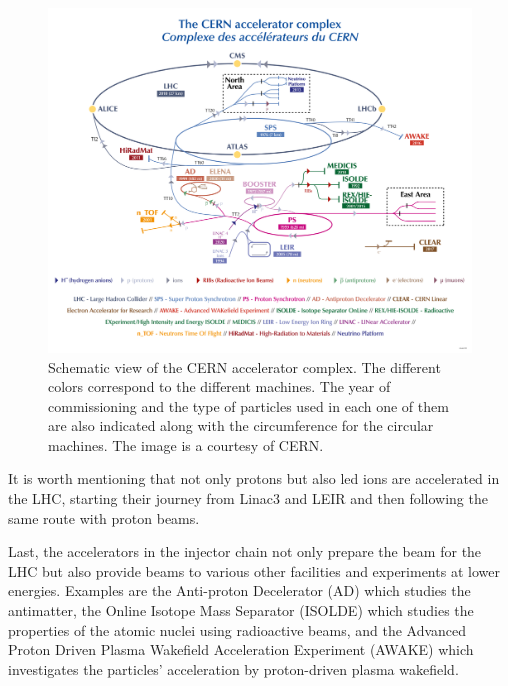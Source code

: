 \begin{figure}[!h] %
    \centering         
    \includegraphics[width=1\textwidth]{images/introduction/cern_accelerator_complex.png}
        \caption{Schematic view of the CERN accelerator complex. The different colors correspond to the different machines. The year of commissioning and the type of particles used in each one of them are also indicated along with the circumference for the circular machines. The image is a courtesy of CERN.}
        \label{fig:cern_accelerator_complex}
 \end{figure}

 It is worth mentioning that not only protons but also led ions are accelerated in the LHC, starting their journey from Linac3 and LEIR and then following the same route with proton beams.


 Last, the accelerators in the injector chain not only prepare the beam for the LHC but also provide beams to various other facilities and experiments at lower energies. Examples are the Anti-proton Decelerator (AD) which studies the antimatter, the Online Isotope Mass Separator (ISOLDE) which studies the properties of the atomic nuclei using radioactive beams, and the Advanced Proton Driven Plasma Wakefield Acceleration Experiment (AWAKE) which investigates the particles' acceleration by proton-driven plasma wakefield.

